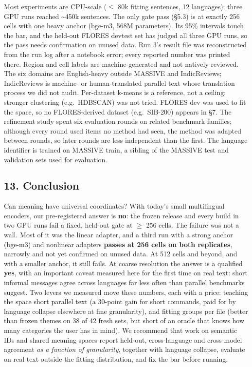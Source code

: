 \documentclass[
  10pt,
]{article}
\begin{document}
Most experiments are CPU-scale ($\leq$ 80k fitting sentences, 12 languages);
three GPU runs reached \textasciitilde450k sentences. The only gate pass
(\S{}5.3) is at exactly 256 cells with one heavy anchor (bge-m3, 568M
parameters). Its 95\% intervals touch the bar, and the held-out FLORES
devtest set has judged all three GPU runs, so the pass needs
confirmation on unused data. Run 3's result file was reconstructed from
the run log after a notebook error; every reported number was printed
there. Region and cell labels are machine-generated and not natively
reviewed. The six domains are English-heavy outside MASSIVE and
IndicReviews; IndicReviews is machine- or human-translated parallel text
whose translation process we did not audit. Per-dataset k-means is a
reference, not a ceiling; stronger clustering (e.g.~HDBSCAN) was not
tried. FLORES dev was used to fit the space, so no FLORES-derived
dataset (e.g.~SIB-200) appears in \S{}7. The refinement study spent six
evaluation rounds on related benchmark families; although every round
used items no method had seen, the method was adapted between rounds, so
later rounds are less independent than the first. The language
identifier is trained on MASSIVE train, a sibling of the MASSIVE test
and validation sets used for evaluation.

\hypertarget{conclusion}{%
\subsection{13. Conclusion}\label{conclusion}}

Can meaning have universal coordinates? With today's small multilingual
encoders, our pre-registered answer is \textbf{no}: the frozen release
and every build in two GPU runs fail a fixed, held-out gate at $\geq$ 256
cells. The failure was not a wall. Most of it was the linear adapter,
and a third run with a strong anchor (bge-m3) and nonlinear adapters
\textbf{passes at 256 cells on both replicates}, narrowly and not yet
confirmed on unused data. At 512 cells and beyond, and with a smaller
anchor, it still fails. At coarse resolution the answer is a qualified
\textbf{yes}, with an important caveat measured here for the first time
on real text: short informal messages agree across languages far less
often than parallel benchmarks suggest. Two levers we measured move
these numbers, each with a price: teaching the space short parallel text
(a 30-point gain for short commands, paid for by language collapse
elsewhere at fine granularity), and fitting groups per file (better than
frozen themes on 38 of 42 fresh sets, but short of an oracle that knows
how many categories the user has in mind). We recommend that work on
semantic IDs and shared meaning spaces report held-out, cross-language
and cross-model agreement \emph{as a function of granularity}, together
with language collapse, evaluate on real text outside the fitting
distribution, and fix the bar before running.
\end{document}
